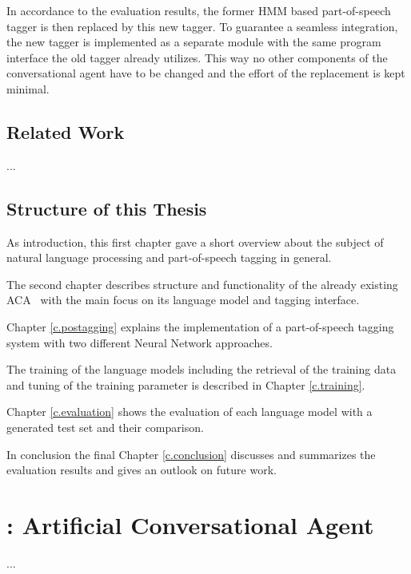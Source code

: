 In accordance to the evaluation results, the former HMM based part-of-speech tagger is then replaced by this new tagger. To guarantee a seamless integration, the new tagger is implemented as a separate module with the same program interface the old tagger already utilizes. This way no other components of the conversational agent have to be changed and the effort of the replacement is kept minimal.

\section{Related Work}\label{c.introduction.related}
...

\section{Structure of this Thesis}\label{c.introduction.structure}
As introduction, this first chapter gave a short overview about the subject of natural language processing and part-of-speech tagging in general.

The second chapter describes structure and functionality of the already existing ACA \Alex\ with the main focus on its language model and tagging interface.

Chapter \ref{c.postagging} explains the implementation of a part-of-speech tagging system with two different Neural Network approaches.

The training of the language models including the retrieval of the training data and tuning of the training parameter is described in Chapter \ref{c.training}.

Chapter \ref{c.evaluation} shows the evaluation of each language model with a generated test set and their comparison.

In conclusion the final Chapter \ref{c.conclusion} discusses and summarizes the evaluation results and gives an outlook on future work.

\chapter{\Alex: Artificial Conversational Agent}\label{c.alex}
...

